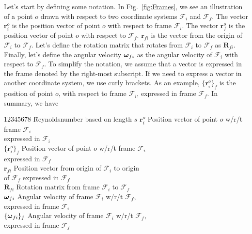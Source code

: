 Let's start by defining some notation.  In Fig.~\ref{fig:Frames}, we
see an illustration of a point $o$ drawn with respect to two
coordinate systems $\mathcal{F}_i$ and $\mathcal{F}_f$.  The vector
$\mathbf{r}_i^o$ is the position vector of point $o$ with respect to
frame $\mathcal{F}_i$.  The vector $\mathbf{r}_f^o$ is the position
vector of point $o$ with respect to $\mathcal{F}_f$.
$\mathbf{r}_{fi}$ is the vector from the origin of $\mathcal{F}_i$
to $\mathcal{F}_f$.  Let's define the rotation matrix that rotates
from $\mathcal{F}_i$ to $\mathcal{F}_f$ as $\mathbf{R}_{fi}$.
Finally, let's define the  angular velocity $\mbox{\boldmath{$\omega
$}}_{fi}$ as the angular velocity of $\mathcal{F}_i$ with respect to
$\mathcal{F}_f$.  To simplify the notation, we assume that a vector
is expressed in the frame denoted by the right-most subscript.  If
we need to express a vector in another coordinate system, we use
curly brackets.  As an example, $\{\mathbf{r}_i^o\}_f$ is the
position of point $o$, with respect to frame $\mathcal{F}_i$,
expressed in frame $\mathcal{F}_f$.  In summary, we have
%
\begin{tabbing}
%
12345678 \= Reynoldsnumber based on length $s$ \kill
$\mathbf{r}^{o}_{i}$        \> Position vector of point $o$ w/r/t frame $\mathcal{F}_i$ \+ \\
                               expressed in $\mathcal{F}_i$ \-\\
%
$\{\mathbf{r}^{o}_{i}\}_f$      \> Position vector of point $o$ w/r/t frame $\mathcal{F}_i$\+ \\
                                   expressed in $\mathcal{F}_f$  \-\\
%
$\mathbf{r}_{fi}$        \> Position vector from origin of $\mathcal{F}_i$ to origin\+ \\
                         of $\mathcal{F}_f$ expressed in $\mathcal{F}_f$  \-\\
%
$\mathbf{R}_{fi}$      \> Rotation matrix from frame $\mathcal{F}_i$ to $\mathcal{F}_f$\\
%
$\mbox{\boldmath{$\omega $}}_{fi}$   \>  Angular velocity of frame
$\mathcal{F}_i$ w/r/t $\mathcal{F}_f$, \+ \\ expressed in frame
$\mathcal{F}_i$\-\\
%
$\{\mbox{\boldmath{$\omega $}}_{fi}\}_f$   \>  Angular velocity of
frame $\mathcal{F}_i$ w/r/t $\mathcal{F}_f$, \+ \\ expressed in
frame
$\mathcal{F}_f$\-\\
\end{tabbing}


